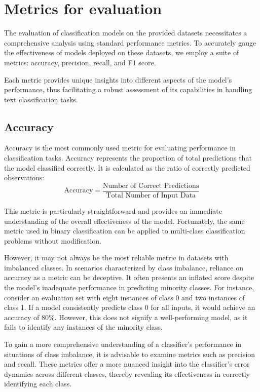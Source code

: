 
\section{Metrics for evaluation}
\label{sec:metrics}

The evaluation of classification models on the provided datasets necessitates a comprehensive analysis using standard performance metrics. To accurately gauge the effectiveness of models deployed on these datasets, we employ a suite of metrics: accuracy, precision, recall, and F1 score.

Each metric provides unique insights into different aspects of the model's performance, thus facilitating a robust assessment of its capabilities in handling text classification tasks.

\subsection{Accuracy}

Accuracy is the most commonly used metric for evaluating performance in classification tasks. Accuracy represents the proportion of total predictions that the model classified correctly. It is calculated as the ratio of correctly predicted observations:
$$
    \text{Accuracy} = \frac{\text{Number of Correct Predictions}}{\text{Total Number of Input Data}}
$$

This metric is particularly straightforward and provides an immediate understanding of the overall effectiveness of the model. Fortunately, the same metric used in binary classification can be applied to multi-class classification problems without modification.

However, it may not always be the most reliable metric in datasets with imbalanced classes. In scenarios characterized by class imbalance, reliance on accuracy as a metric can be deceptive. It often presents an inflated score despite the model's inadequate performance in predicting minority classes. For instance, consider an evaluation set with eight instances of class 0 and two instances of class 1. If a model consistently predicts class 0 for all inputs, it would achieve an accuracy of $80\%$. However, this does not signify a well-performing model, as it fails to identify any instances of the minority class.

To gain a more comprehensive understanding of a classifier's performance in situations of class imbalance, it is advisable to examine metrics such as precision and recall. These metrics offer a more nuanced insight into the classifier's error dynamics across different classes, thereby revealing its effectiveness in correctly identifying each class.

